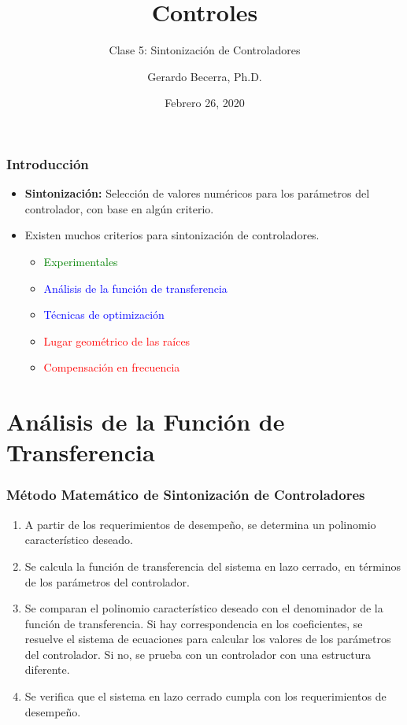 \documentclass[aspectratio=169,handout]{beamer}
\title{Controles}
\subtitle{\small Clase 5: Sintonización de Controladores}
\author{Gerardo Becerra, Ph.D.}
\institute{Pontificia Universidad Javeriana\\ Departamento de Electrónica}
\date{Febrero 26, 2020}
\theoremstyle{definition}
\theoremstyle{plain}
\theoremstyle{remark}
\begin{document}
\frame{\titlepage}	


\begin{frame}[<+->]\frametitle{Introducción}
\vspace*{5mm}
\centering
\begin{itemize}
	\item \textbf{Sintonización:} Selección de valores numéricos para los parámetros del controlador, con base en algún criterio.
	\item Existen muchos criterios para sintonización de controladores.
	\begin{itemize}
		\item \textcolor{green}{Experimentales}
		\item \textcolor{blue}{Análisis de la función de transferencia}
		\item \textcolor{blue}{Técnicas de optimización}
		\item \textcolor{red}{Lugar geométrico de las raíces}
		\item \textcolor{red}{Compensación en frecuencia}
	\end{itemize}
\end{itemize}
\end{frame}

\section{Análisis de la Función de Transferencia}
\begin{frame}[<+->]\frametitle{Método Matemático de Sintonización de Controladores}
\begin{enumerate}
	\item A partir de los requerimientos de desempeño, se determina un polinomio característico deseado.
	\item Se calcula la función de transferencia del sistema en lazo cerrado, en términos de los parámetros del controlador.
	\item Se comparan el polinomio característico deseado con el denominador de la función de transferencia. Si hay correspondencia en los coeficientes, se resuelve el sistema de ecuaciones para calcular los valores de los parámetros del controlador. Si no, se prueba con un controlador con una estructura diferente.
	\item Se verifica que el sistema en lazo cerrado cumpla con los requerimientos de desempeño.
\end{enumerate}
\end{frame}
\end{document}
